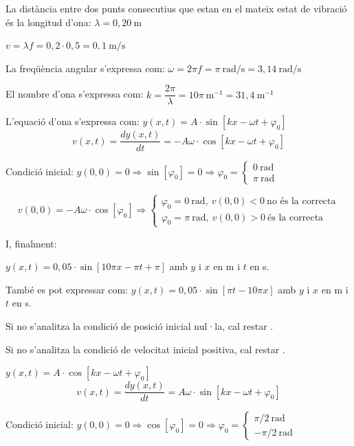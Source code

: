 \begin{solapartat}
 La distància entre dos punts consecutius que estan en el mateix estat de vibració és la longitud d'ona: $\lambda = 0,20\ \mathrm{m}$

 $v = \lambda f = 0,2\cdot 0,5 = 0,1\ \mathrm{m/s}$

 La freqüència angular s'expressa com: $\omega = 2\pi f = \pi\ \mathrm{rad/s} = 3,14\ \mathrm{rad/s}$

 El nombre d'ona s'expressa com: $k = \dfrac{2\pi}{\lambda} = 10\pi\ \mathrm{m^{-1}} = 31,4\ \mathrm{m^{-1}}$

 L'equació d'ona s'expressa com: $y(x,t) = A\cdot\sin[kx - \omega t + \varphi_0]$
\[ v(x,t) = \frac{dy(x,t)}{dt} = -A\omega\cdot\cos[kx - \omega t + \varphi_0] \]

Condició inicial: $y(0,0) = 0 \Rightarrow \sin[\varphi_0] = 0 \Rightarrow \varphi_0 = \begin{cases}0\ \mathrm{rad}\\ \pi\ \mathrm{rad}\end{cases}$

\[ v(0,0) = -A\omega\cdot\cos[\varphi_0] \Rightarrow \begin{cases}\varphi_0 = 0\ \mathrm{rad},\ v(0,0) < 0\ \text{no és la correcta}\\ \varphi_0 = \pi\ \mathrm{rad},\ v(0,0) > 0\ \text{és la correcta}\end{cases} \]

I, finalment:

$y(x,t) = 0,05\cdot\sin[10\pi x - \pi t + \pi]$ amb $y$ i $x$ en m i $t$ en s.

També es pot expressar com: $y(x,t) = 0,05\cdot\sin[\pi t - 10\pi x]$ amb $y$ i $x$ en m i $t$ en s.

Si no s'analitza la condició de posició inicial nul·la, cal restar .

Si no s'analitza la condició de velocitat inicial positiva, cal restar .

 $y(x,t) = A\cdot\cos[kx - \omega t + \varphi_0]$
\[ v(x,t) = \frac{dy(x,t)}{dt} = A\omega\cdot\sin[kx - \omega t + \varphi_0] \]

Condició inicial: $y(0,0) = 0 \Rightarrow \cos[\varphi_0] = 0 \Rightarrow \varphi_0 = \begin{cases}\pi/2\ \mathrm{rad}\\ -\pi/2\ \mathrm{rad}\end{cases}$


\end{solapartat}
